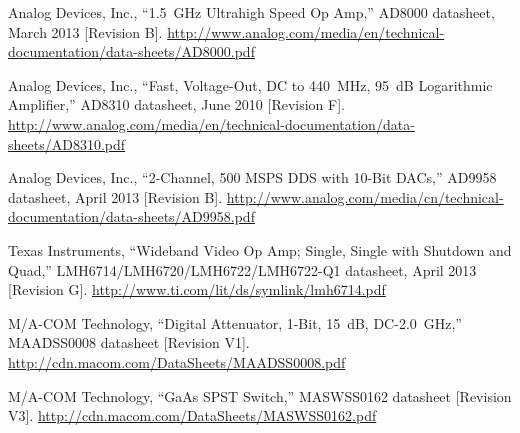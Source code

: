 \renewcommand{\bibsection}{%
    \chapter{\bibname}
    \prebibhook}
\begin{thebibliography}{9}

%
%
Analog Devices, Inc., ``1.5~GHz Ultrahigh Speed Op Amp,'' AD8000 datasheet,
March 2013 [Revision B].
\url{http://www.analog.com/media/en/technical-documentation/data-sheets/AD8000.pdf}

Analog Devices, Inc., ``Fast, Voltage-Out, DC to 440~MHz, 95~dB Logarithmic Amplifier,''
AD8310 datasheet, June 2010 [Revision F].
\url{http://www.analog.com/media/en/technical-documentation/data-sheets/AD8310.pdf}

Analog Devices, Inc., ``2-Channel, 500 MSPS DDS with 10-Bit DACs,'' AD9958 datasheet,
April 2013 [Revision B].
\url{http://www.analog.com/media/cn/technical-documentation/data-sheets/AD9958.pdf}

%
%
Texas Instruments, ``Wideband Video Op Amp; Single, Single with Shutdown and Quad,''
LMH6714/LMH6720/LMH6722/LMH6722-Q1 datasheet, April 2013 [Revision G].
\url{http://www.ti.com/lit/ds/symlink/lmh6714.pdf}

M/A-COM Technology, ``Digital Attenuator, 1-Bit, 15~dB, DC-2.0~GHz,'' MAADSS0008 datasheet [Revision V1].
\url{http://cdn.macom.com/DataSheets/MAADSS0008.pdf}

M/A-COM Technology, ``GaAs SPST Switch,'' MASWSS0162 datasheet [Revision V3].
\url{http://cdn.macom.com/DataSheets/MASWSS0162.pdf}


\end{thebibliography}
